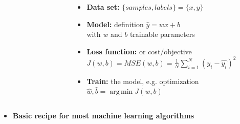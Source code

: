 \documentclass[aspectratio=1610]{beamer}
\DeclareMathOperator*{\argmin}{arg\,min}
\begin{document}
\begin{frame}
\begin{columns}
\begin{column}{0.43\textwidth}
\begin{figure}
            \end{figure}
        \end{column}
        \begin{column}{0.53\textwidth}
            \begin{itemize}
                \item<1-> \textbf{Data set:} $\{samples, labels\}=\{x, y\}$
                \item<2-> \textbf{Model:} definition $\hat{y}=wx+b$\\ with $w$ and $b$ trainable parameters
                \item<3-> \textbf{Loss function:} or cost/objective\\
                $J(w,b)=MSE(w,b)=\frac{1}{N}\sum_{i=1}^{N}(y_i-\hat{y_i})^2$
                \item<4-> \textbf{Train:} the model, e.g. optimization\\
                $\hat{w}, \hat{b}=\argmin J(w, b)$ \\
                
            \end{itemize}
        \end{column}
    \end{columns}

    \bigskip
    \begin{itemize}
        \item<5>
            \begin{center}
                \textbf{Basic recipe for most machine learning algorithms}
            \end{center}
    \end{itemize}
\end{frame}
\end{document}
